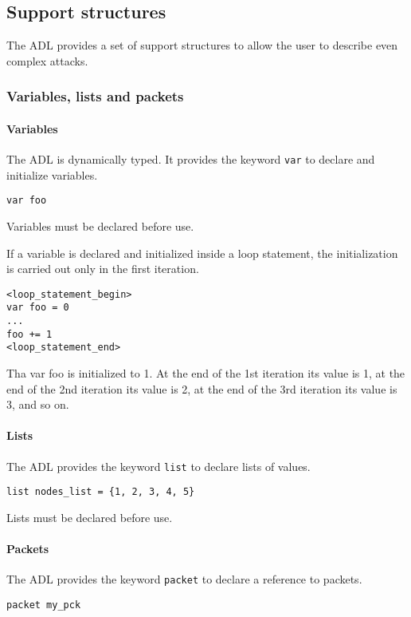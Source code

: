 \subsection{Support structures}
The ADL provides a set of support structures to allow the user to describe even complex attacks.

\subsubsection{Variables, lists and packets}

\paragraph{Variables}
The ADL is dynamically typed. It provides the keyword \texttt{var} to declare and initialize variables.
%
\begin{lstlisting}[language={adl}]
var foo
\end{lstlisting}
%
Variables must be declared before use.

If a variable is declared and initialized inside a loop statement, the initialization is carried out only in the first iteration.
%
\begin{lstlisting}[language={adl}]
<loop_statement_begin>
var foo = 0
...
foo += 1
<loop_statement_end>
\end{lstlisting}
%
Tha var foo is initialized to 1. At the end of the 1st iteration its value is 1, at the end of the 2nd iteration its value is 2, at the end of the 3rd iteration its value is 3, and so on.

\paragraph{Lists}
The ADL provides the keyword \texttt{list} to declare lists of values.
%
\begin{lstlisting}[language={adl}]
list nodes_list = {1, 2, 3, 4, 5}
\end{lstlisting}
%
Lists must be declared before use.

\paragraph{Packets}
The ADL provides the keyword \texttt{packet} to declare a reference to packets.
%
\begin{lstlisting}[language={adl}]
packet my_pck
\end{lstlisting}

